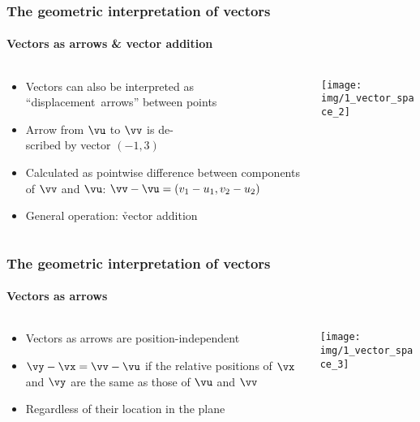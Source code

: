 \begin{frame}
  \frametitle{The geometric interpretation of vectors}
  \framesubtitle{Vectors as arrows \& vector addition}

  \begin{columns}[T]
    \begin{column}{48mm}
      \begin{itemize}
      \item Vectors can also be interpreted as ``displacement~arrows'' between
        points
      \item Arrow from $\vu$ to $\vv$ is de-\\scribed by vector
        $(-1,3)$
      \item Calculated as pointwise difference between components of $\vv$ and
        $\vu$: $\vv - \vu = (v_1-u_1, v_2-u_2)$
      \item General operation: \h{vector addition}
      \end{itemize}
    \end{column}
    \begin{column}{55mm}
      \texttt{[image: img/1\_vector\_space\_2]}      
    \end{column}
  \end{columns}
\end{frame}

\begin{frame}
  \frametitle{The geometric interpretation of vectors}
  \framesubtitle{Vectors as arrows}

  \begin{columns}[T]
    \begin{column}{48mm}
      \begin{itemize}
      \item Vectors as arrows are position-independent
      \item $\vy - \vx = \vv - \vu$ if the
        relative positions of $\vx$ and $\vy$ are the same as
        those of $\vu$ and $\vv$
      \item Regardless of their location in the plane
      \end{itemize}
    \end{column}
    \begin{column}{55mm}
      \texttt{[image: img/1\_vector\_space\_3]}      
    \end{column}
  \end{columns}
\end{frame}

